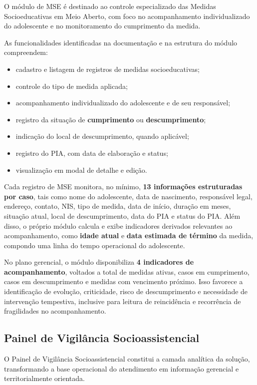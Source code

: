 \documentclass[12pt,a4paper]{article}
\begin{document}
O módulo de MSE é destinado ao controle especializado das Medidas Socioeducativas em Meio Aberto, com foco no acompanhamento individualizado do adolescente e no monitoramento do cumprimento da medida.

As funcionalidades identificadas na documentação e na estrutura do módulo compreendem:

\begin{itemize}[leftmargin=1.5cm]
\item cadastro e listagem de registros de medidas socioeducativas;
\item controle do tipo de medida aplicada;
\item acompanhamento individualizado do adolescente e de seu responsável;
\item registro da situação de \textbf{cumprimento} ou \textbf{descumprimento};
\item indicação do local de descumprimento, quando aplicável;
\item registro do PIA, com data de elaboração e status;
\item visualização em modal de detalhe e edição.
\end{itemize}

Cada registro de MSE monitora, no mínimo, \textbf{13 informações estruturadas por caso}, tais como nome do adolescente, data de nascimento, responsável legal, endereço, contato, NIS, tipo de medida, data de início, duração em meses, situação atual, local de descumprimento, data do PIA e status do PIA. Além disso, o próprio módulo calcula e exibe indicadores derivados relevantes ao acompanhamento, como \textbf{idade atual} e \textbf{data estimada de término} da medida, compondo uma linha do tempo operacional do adolescente.

No plano gerencial, o módulo disponibiliza \textbf{4 indicadores de acompanhamento}, voltados a total de medidas ativas, casos em cumprimento, casos em descumprimento e medidas com vencimento próximo. Isso favorece a identificação de evolução, criticidade, risco de descumprimento e necessidade de intervenção tempestiva, inclusive para leitura de reincidência e recorrência de fragilidades no acompanhamento.

\subsection{Painel de Vigilância Socioassistencial}

O Painel de Vigilância Socioassistencial constitui a camada analítica da solução, transformando a base operacional do atendimento em informação gerencial e territorialmente orientada.
\end{document}
